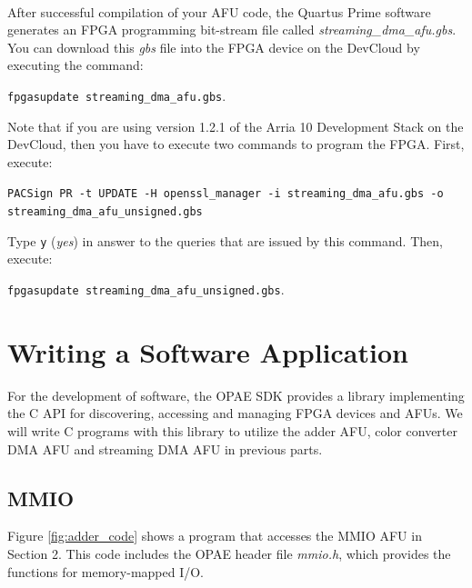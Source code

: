 \documentclass[11pt, twoside, pdftex]{article}
\begin{document}
\begin{enumerate}
~\\
\noindent
After successful compilation of your AFU code, the Quartus Prime software generates an FPGA 
programming bit-stream file called {\it streaming\_dma\_afu.gbs}. You can download this {\it gbs} file into the FPGA device on the DevCloud by executing the command:

\noindent
\begin{center}
\texttt{fpgasupdate streaming\_dma\_afu.gbs}.
\end{center}

Note that if you are using version 1.2.1 of the Arria 10 Development Stack on the
DevCloud, then you have to execute two commands to program the FPGA. First, execute:

\noindent
\begin{center}
\texttt{PACSign PR -t UPDATE -H openssl\_manager -i streaming\_dma\_afu.gbs -o streaming\_dma\_afu\_unsigned.gbs}
\end{center}

\noindent Type \texttt{y} ({\it yes}) in answer to the queries that are issued by this command. 
Then, execute:

\noindent
\begin{center}
\texttt{fpgasupdate streaming\_dma\_afu\_unsigned.gbs}.
\end{center}
 \end{enumerate}
 
 
 \section{Writing a Software Application}
 For the development of software, the OPAE SDK provides a library implementing the C API for discovering, accessing and managing FPGA devices and AFUs. We will write C programs with this library to utilize the adder AFU, color converter DMA AFU and streaming DMA AFU in previous parts.
 
 \subsection{MMIO}
 Figure \ref{fig:adder_code} shows a program that accesses the MMIO AFU in Section 2. This code includes the OPAE header file {\it mmio.h}, which provides the functions for memory-mapped I/O.\\
 
\end{document}
